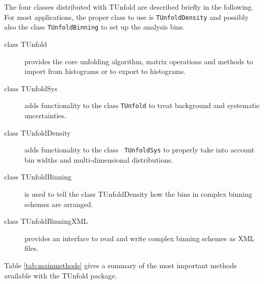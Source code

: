 \documentclass[12pt]{article}
\begin{document}
The four classes distributed with TUnfold are described briefly in the
following. For most applications, the 
proper class to use is {\tt TUnfoldDensity} and possibly also the class
{\tt TUnfoldBinning} to set up the analysis bins.
\begin{description}
\item[class TUnfold] provides the core unfolding algorithm, matrix
  operations and methods to import from histograms or to export to
  histograms.
\item[class TUnfoldSys] adds functionality to the class {\tt TUnfold}
  to treat background and systematic uncertainties.
\item[class TUnfoldDensity] adds functionality to the class {\tt
    TUnfoldSys} to properly take into account bin widths and
  multi-dimensional distributions.
\item[class TUnfoldBinning] is used to tell the class TUnfoldDensity
  how the bins in complex binning schemes are arranged.
\item[class TUnfoldBinningXML] provides an interface to read and write complex binning schemes as XML files.
\end{description}
Table \ref{tab:mainmethods} gives a summary of the most important methods
available with the TUnfold package.
\end{document}
